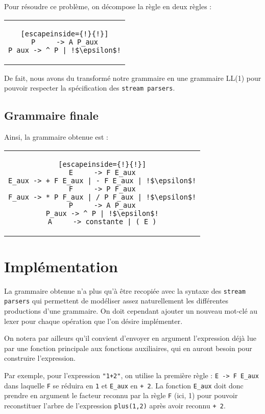 \documentclass[11pt]{article}
\begin{document}
Pour résoudre ce problème, on décompose la règle en deux règles :
\begin{center}
\begin{tabular}{c}
\begin{lstlisting}[escapeinside={!}{!}]
P     -> A P_aux
P_aux -> ^ P | !$\epsilon$!
\end{lstlisting}
\end{tabular}
\end{center}

De fait, nous avons du transformé notre grammaire en une grammaire LL(1) pour pouvoir respecter la spécification des \texttt{stream parsers}.


\subsection{Grammaire finale}
Ainsi, la grammaire obtenue est :
\begin{center}
\begin{tabular}{c}
\begin{lstlisting}[escapeinside={!}{!}]
E     -> F E_aux
E_aux -> + F E_aux | - F E_aux | !$\epsilon$!
F     -> P F_aux
F_aux -> * P F_aux | / P F_aux | !$\epsilon$!
P     -> A P_aux
P_aux -> ^ P | !$\epsilon$!
A     -> constante | ( E )
\end{lstlisting}
\end{tabular}
\end{center}
 

\section{Implémentation}
La grammaire obtenue n'a plus qu'à être recopiée avec la syntaxe des \texttt{stream parsers} qui permettent de modéliser assez naturellement les différentes productions d'une grammaire. On doit cependant ajouter un nouveau mot-clé au lexer pour chaque opération que l'on désire implémenter. 

On notera par ailleurs qu'il convient d'envoyer en argument l'expression déjà lue par une fonction principale aux fonctions auxiliaires, qui en auront besoin pour construire l'expression. 

Par exemple,  pour l'expression \texttt{"1+2"}, on utilise la première règle : \lstinline{E -> F E_aux} dans laquelle \lstinline{F} se réduira en \lstinline{1} et \lstinline{E_aux} en \lstinline{+ 2}. La fonction \lstinline{E_aux} doit donc prendre en argument le facteur reconnu par la règle \lstinline{F} (ici, 1) pour pouvoir reconstituer l'arbre de l'expression \lstinline{plus(1,2)} après avoir reconnu \lstinline{+ 2}.
\end{document}
